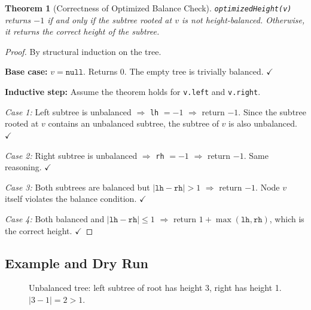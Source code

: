 \documentclass[10pt,journal,compsoc,onecolumn]{IEEEtran}
\newtheorem{theorem}{Theorem}
\begin{document}
\begin{theorem}[Correctness of Optimized Balance Check]
\texttt{optimizedHeight(v)} returns $-1$ if and only if the subtree rooted at $v$ is not height-balanced. Otherwise, it returns the correct height of the subtree.
\end{theorem}

\begin{proof}
By structural induction on the tree.

\textbf{Base case:} $v = \texttt{null}$. Returns $0$. The empty tree is trivially balanced. $\checkmark$

\textbf{Inductive step:} Assume the theorem holds for \texttt{v.left} and \texttt{v.right}.

\emph{Case 1:} Left subtree is unbalanced $\Rightarrow$ \texttt{lh} $= -1$ $\Rightarrow$ return $-1$. Since the subtree rooted at $v$ contains an unbalanced subtree, the subtree of $v$ is also unbalanced. $\checkmark$

\emph{Case 2:} Right subtree is unbalanced $\Rightarrow$ \texttt{rh} $= -1$ $\Rightarrow$ return $-1$. Same reasoning. $\checkmark$

\emph{Case 3:} Both subtrees are balanced but $|\texttt{lh} - \texttt{rh}| > 1$ $\Rightarrow$ return $-1$. Node $v$ itself violates the balance condition. $\checkmark$

\emph{Case 4:} Both balanced and $|\texttt{lh} - \texttt{rh}| \leq 1$ $\Rightarrow$ return $1 + \max(\texttt{lh}, \texttt{rh})$, which is the correct height. $\checkmark$
\end{proof}

\subsection{Example and Dry Run}

\begin{figure}[htbp]
\centering
{}
\caption{Unbalanced tree: left subtree of root has height 3, right has height 1. $|3-1| = 2 > 1$.}
\end{figure}
\end{document}
